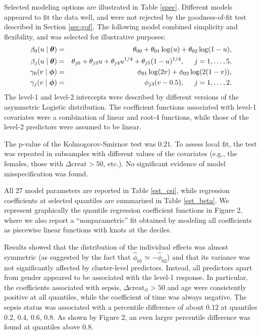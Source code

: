 \documentclass[12pt]{article}
\def\thetavec{\bm{\theta}}
\def\phivec{\bm{\phi}}
\begin{document}
Selected modeling options are illustrated in Table \ref{spec}. 
Different models appeared to fit the data well, and were not rejected by the goodness-of-fit
test described in Section \ref{sec:gof}. The following model combined simplicity
and flexibility, and was selected for illustrative purposes:
\begin{eqnarray}
\beta_0(u \mid \thetavec) &=& \theta_{00} + \theta_{01}\log(u) + \theta_{02}\log(1 - u), \nonumber\\
\beta_j(u \mid \thetavec) &=& \theta_{j0} + \theta_{j3}u + \theta_{j4}u^{1/4} + \theta_{j5}(1 - u)^{1/4}, \hspace{0.5cm} j = 1, \ldots, 5, \nonumber\\
\gamma_0(v \mid \phivec) &=& \phi_{01}\log(2v) + \phi_{02}\log(2(1 - v)), \nonumber\\
\gamma_j(v \mid \phivec) &=& \phi_{j3}(v - 0.5), \hspace{0.5cm} j = 1, \ldots, 2. \nonumber
\end{eqnarray}
The level-1 and level-2 intercepts were described by different versions of the asymmetric Logistic distribution.
The coefficient functions associated with level-1 covariates were a combination of linear and root-4 functions,
while those of the level-2 predictors were assumed to be linear.

The p-value of the Kolmogorov-Smirnov test was $0.21$. To assess local fit, the test was repeated 
in subsamples with different values of the covariates (e.g., the females, those with $\Delta{\text{creat}} > 50$, etc.).
No significant evidence of model misspecification was found.

All 27 model parameters are reported in Table \ref{est_csi}, while regression coefficients at selected quantiles are
summarized in Table \ref{est_beta}. We represent graphically the quantile regression coefficient functions in Figure 2,
where we also report a ``nonparametric'' fit obtained by modeling all coefficients 
as piecewise linear functions with knots at the deciles.

Results showed that the distribution of the individual effects was almost symmetric (as suggested by the fact that
$\hat\phi_{01} \simeq -\hat\phi_{02}$) and that its variance was not significantly affected by 
cluster-level predictors. Instead, all predictors apart from gender appeared to be associated with the level-1 response. 
In particular, the coefficients associated with sepsis, $\Delta{\text{creat}}_{it} > 50$ and age were consistently positive
at all quantiles, while the coefficient of time was always negative. 
The sepsis status was associated with a percentile difference of about 0.12 at quantiles 0.2, 0.4, 0.6, 0.8. 
As shown by Figure 2, an even larger percentile difference was found at quantiles above 0.8. 
\end{document}
